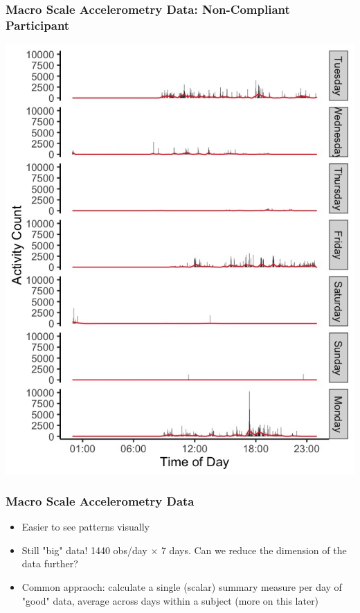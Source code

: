 \documentclass[10pt]{beamer}\usepackage[]{graphicx}\usepackage[]{color}
\begin{document}
\begin{frame}
\frametitle{Macro Scale Accelerometry Data: Non-Compliant Participant}
\centering
\includegraphics[height=\textheight]{profile_id2}
\end{frame}


\begin{frame}
\frametitle{Macro Scale Accelerometry Data}
\begin{itemize}
\item Easier to see patterns visually
\item Still "big" data! 1440 obs/day $\times$ 7 days. Can we reduce the dimension of the data further?
\item Common appraoch: calculate a single (scalar) summary measure per day of "good" data, 
average across days within a subject (more on this later)

\end{itemize}
\end{frame}
\end{document}
